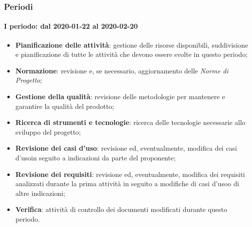 \subsubsection{Periodi}
\paragraph*{I periodo: dal 2020-01-22 al 2020-02-20}
\begin{itemize}
	\item \textbf{Pianificazione delle attività}: gestione delle risorse disponibili, suddivisione e pianificazione di tutte le attività che devono essere svolte in questo periodo;
	\item \textbf{Normazione}: revisione e, se necessario, aggiornamento delle \textit{Norme di Progetto};
	\item \textbf{Gestione della qualità}: revisione delle metodologie per mantenere e garantire la qualità del prodotto\glo;
	\item \textbf{Ricerca di strumenti e tecnologie}: ricerca delle tecnologie necessarie allo sviluppo del progetto\glo;
	\item \textbf{Revisione dei casi d'uso}: revisione ed, eventualmente, modifica dei casi d'uso\glosp in seguito a indicazioni da parte del proponente;
	\item \textbf{Revisione dei requisiti}: revisione ed, eventualmente, modifica dei requisiti analizzati durante la prima attività in seguito a modifiche di casi d'uso\glosp o di altre indicazioni; 
	\item \textbf{Verifica}: attività di controllo dei documenti modificati durante questo periodo.
\end{itemize}

